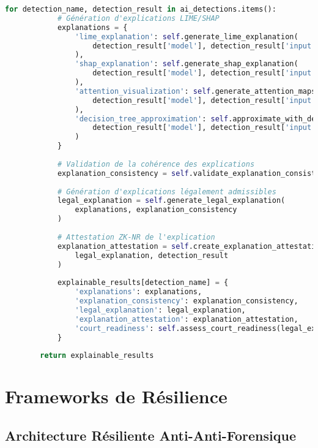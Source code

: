 \begin{lstlisting}[language=Python, caption=Système d'IA pour contrer l'anti-forensique]
        for detection_name, detection_result in ai_detections.items():
            # Génération d'explications LIME/SHAP
            explanations = {
                'lime_explanation': self.generate_lime_explanation(
                    detection_result['model'], detection_result['input']
                ),
                'shap_explanation': self.generate_shap_explanation(
                    detection_result['model'], detection_result['input']
                ),
                'attention_visualization': self.generate_attention_maps(
                    detection_result['model'], detection_result['input']
                ),
                'decision_tree_approximation': self.approximate_with_decision_tree(
                    detection_result['model'], detection_result['input']
                )
            }
            
            # Validation de la cohérence des explications
            explanation_consistency = self.validate_explanation_consistency(explanations)
            
            # Génération d'explications légalement admissibles
            legal_explanation = self.generate_legal_explanation(
                explanations, explanation_consistency
            )
            
            # Attestation ZK-NR de l'explication
            explanation_attestation = self.create_explanation_attestation(
                legal_explanation, detection_result
            )
            
            explainable_results[detection_name] = {
                'explanations': explanations,
                'explanation_consistency': explanation_consistency,
                'legal_explanation': legal_explanation,
                'explanation_attestation': explanation_attestation,
                'court_readiness': self.assess_court_readiness(legal_explanation)
            }
            
        return explainable_results
\end{lstlisting}

\section{Frameworks de Résilience}

\subsection{Architecture Résiliente Anti-Anti-Forensique}

